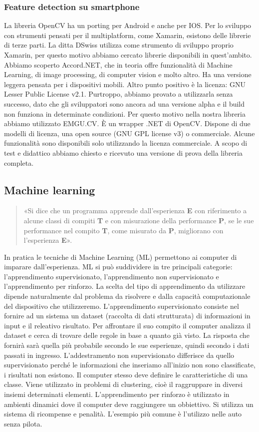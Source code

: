 \documentclass[twoside]{supsistudent}
\begin{document}
\subsubsection{Feature detection su smartphone}%
La libreria OpenCV ha un porting per Android e anche per IOS. Per lo sviluppo con strumenti pensati per il multiplatform, come Xamarin\cite{xamarin}, esistono delle librerie di terze parti. La ditta DSwiss utilizza come strumento di sviluppo proprio Xamarin, per questo motivo abbiamo cercato librerie disponibili in quest'ambito. Abbiamo scoperto Accord.NET\cite{accordNet}, che in teoria offre funzionalità di Machine Learning, di image processing, di computer vision e molto altro. Ha una versione leggera pensata per i dispositivi mobili. Altro punto positivo è la licenza: GNU Lesser Public License v2.1. Purtroppo, abbiamo provato a utilizzarla senza successo, dato che gli sviluppatori sono ancora ad una versione alpha e il build non funziona in determinate condizioni. Per questo motivo nella nostra libreria abbiamo utilizzato EMGU.CV\cite{emguCv}. È un wrapper .NET di OpenCV. Dispone di due modelli di licenza, una open source (GNU GPL license v3) o commerciale. Alcune funzionalità sono disponibili solo utilizzando la licenza commerciale. A scopo di test e didattico abbiamo chiesto e ricevuto una versione di prova della libreria completa. 
\subsection{Machine learning}%
\begin{quote}
    «Si dice che un programma apprende dall’esperienza \textbf{E} con riferimento a alcune classi di compiti \textbf{T} e con misurazione della performance \textbf{P}, se le sue performance nel compito \textbf{T}, come misurato da \textbf{P}, migliorano con l’esperienza \textbf{E}».
\end{quote}
    In pratica le tecniche di Machine Learning (ML) permettono ai computer di imparare dall'esperienza. ML si può suddividere in tre principali categorie: l'apprendimento supervisionato, l'apprendimento non supervisionato e l'apprendimento per rinforzo. La scelta del tipo di apprendimento da utilizzare dipende naturalmente dal problema da risolvere e dalla capacità computazionale del dispositivo che utilizzeremo.
    L'apprendimento supervisionato consiste nel fornire ad un sistema un dataset (raccolta di dati strutturata) di informazioni in input e il releativo risultato. Per affrontare il suo compito il computer analizza il dataset e cerca di trovare delle regole in base a quanto già visto. La risposta che fornirà sarà quella più probabile secondo le sue esperienze, quindi secondo i dati passati in ingresso. 
    L'addestramento non supervisionato differisce da quello supervisionato perché le informazioni che inseriamo all'inizio non sono classificate, i risultati non esistono. Il computer stesso deve definire le caratteristiche di una classe. Viene utilizzato in problemi di clustering, cioè il raggruppare in diversi insiemi determinati elementi.
    L'apprendimento per rinforzo è utilizzato in ambienti dinamici dove il computer deve raggiungere un obbiettivo. Si utilizza un sistema di ricompense e penalità. L'esempio più comune è l'utilizzo nelle auto senza pilota. 
    
\end{document}

